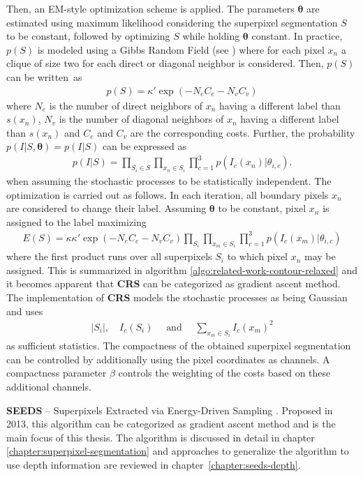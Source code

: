 Then, an EM-style optimization scheme is applied. The parameters $\boldsymbol \theta$ are estimated using maximum likelihood considering the superpixel segmentation $S$ to be constant, followed by optimizing $S$ while holding $\boldsymbol \theta$ constant. In practice, $p(S)$ is modeled using a Gibbs Random Field (\eg see \cite{Bishop:2006}) where for each pixel $x_n$ a clique of size two for each direct or diagonal neighbor is considered. Then, $p(S)$ can be written~as
\begin{align}
	p(S) = \kappa' \exp(- N_{e} C_{e} - N_{v} C_{v})
\end{align}
where $N_{e}$ is the number of direct neighbors of $x_n$ having a different label than $s(x_n)$, $N_{v}$ is the number of diagonal neighbors of $x_n$ having a different label than $s(x_n)$ and $C_e$ and $C_v$ are the corresponding costs. Further, the probability $p(I|S,\boldsymbol \theta) = p(I|S)$ can be expressed as
\begin{align}
	p(I|S) = \prod_{S_i \in S} \prod_{x_n \in S_i} \prod_{c = 1}^3 p(I_c(x_n) | \theta_{i,c}).
\end{align}
when assuming the stochastic processes to be statistically independent. The optimization is carried out as follows. In each iteration, all boundary pixels $x_n$ are considered to change their label. Assuming $\boldsymbol \theta$ to be constant, pixel $x_n$ is assigned to the label maximizing
\begin{align}
	\label{eq:related-work-contour-relaxed-maximize}
	E(S) = \kappa \kappa' \exp(- N_{e} C_{e} - N_{v} C_{v}) \prod_{S_i} \prod_{x_m \in S_i} \prod_{c=1}^3 p(I_c(x_m) | \theta_{i,c})
\end{align}
where the first product runs over all superpixels $S_i$ to which pixel $x_n$ may be assigned.
This is summarized in algorithm \ref{algo:related-work-contour-relaxed} and it becomes apparent that \textbf{CRS} can be categorized as gradient ascent method. The implementation of \textbf{CRS} models the stochastic processes as being Gaussian and uses
\begin{align}
	|S_i|,\quad I_c(S_i)\quad\text{ and }\quad \sum_{x_m \in S_i} I_c(x_m)^2
\end{align}
as sufficient statistics. The compactness of the obtained superpixel segmentation can be controlled by additionally using the pixel coordinates as channels. A compactness parameter $\beta$ controls the weighting of the costs based on these additional channels.

\textbf{SEEDS} -- Superpixels Extracted via Energy-Driven Sampling \cite{VanDenBerghBoixRoigCapitaniVanGool:2012}. Proposed in 2013, this algorithm can be categorized as gradient ascent method and is the main focus of this thesis. The algorithm is discussed in detail in chapter \ref{chapter:superpixel-segmentation} and approaches to generalize the algorithm to use depth information are reviewed in chapter~\ref{chapter:seeds-depth}.


